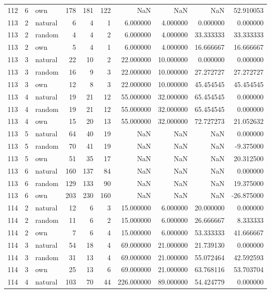 \begin{table}[htbp]
\begin{tabular}{rrlrrrrrrr}
112 & 6 & own & 178 & 181 & 122 & NaN & NaN & NaN & 52.910053 \\
113 & 2 & natural & 6 & 4 & 1 & 6.000000 & 4.000000 & 0.000000 & 0.000000 \\
113 & 2 & random & 4 & 4 & 2 & 6.000000 & 4.000000 & 33.333333 & 33.333333 \\
113 & 2 & own & 5 & 4 & 1 & 6.000000 & 4.000000 & 16.666667 & 16.666667 \\
113 & 3 & natural & 22 & 10 & 2 & 22.000000 & 10.000000 & 0.000000 & 0.000000 \\
113 & 3 & random & 16 & 9 & 3 & 22.000000 & 10.000000 & 27.272727 & 27.272727 \\
113 & 3 & own & 12 & 8 & 3 & 22.000000 & 10.000000 & 45.454545 & 45.454545 \\
113 & 4 & natural & 19 & 21 & 12 & 55.000000 & 32.000000 & 65.454545 & 0.000000 \\
113 & 4 & random & 19 & 21 & 12 & 55.000000 & 32.000000 & 65.454545 & 0.000000 \\
113 & 4 & own & 15 & 20 & 13 & 55.000000 & 32.000000 & 72.727273 & 21.052632 \\
113 & 5 & natural & 64 & 40 & 19 & NaN & NaN & NaN & 0.000000 \\
113 & 5 & random & 70 & 41 & 19 & NaN & NaN & NaN & -9.375000 \\
113 & 5 & own & 51 & 35 & 17 & NaN & NaN & NaN & 20.312500 \\
113 & 6 & natural & 160 & 137 & 84 & NaN & NaN & NaN & 0.000000 \\
113 & 6 & random & 129 & 133 & 90 & NaN & NaN & NaN & 19.375000 \\
113 & 6 & own & 203 & 230 & 160 & NaN & NaN & NaN & -26.875000 \\
114 & 2 & natural & 12 & 6 & 3 & 15.000000 & 6.000000 & 20.000000 & 0.000000 \\
114 & 2 & random & 11 & 6 & 2 & 15.000000 & 6.000000 & 26.666667 & 8.333333 \\
114 & 2 & own & 7 & 6 & 4 & 15.000000 & 6.000000 & 53.333333 & 41.666667 \\
114 & 3 & natural & 54 & 18 & 4 & 69.000000 & 21.000000 & 21.739130 & 0.000000 \\
114 & 3 & random & 31 & 13 & 4 & 69.000000 & 21.000000 & 55.072464 & 42.592593 \\
114 & 3 & own & 25 & 13 & 6 & 69.000000 & 21.000000 & 63.768116 & 53.703704 \\
114 & 4 & natural & 103 & 70 & 44 & 226.000000 & 89.000000 & 54.424779 & 0.000000 \\

\end{tabular}
\end{table}
